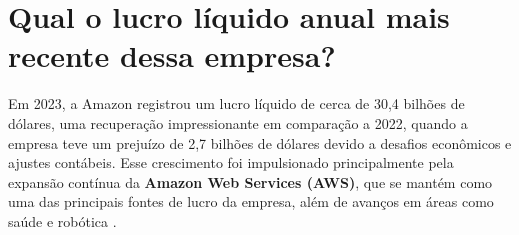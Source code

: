 \section{Qual o lucro líquido anual mais recente dessa empresa?}

Em 2023, a Amazon registrou um lucro líquido de cerca de 30,4 bilhões de dólares, uma recuperação impressionante em comparação a 2022, quando a empresa teve um prejuízo de 2,7 bilhões de dólares devido a desafios econômicos e ajustes contábeis. Esse crescimento foi impulsionado principalmente pela expansão contínua da \textbf{Amazon Web Services (AWS)}, que se mantém como uma das principais fontes de lucro da empresa, além de avanços em áreas como saúde e robótica \cite{amazonQ42023}.